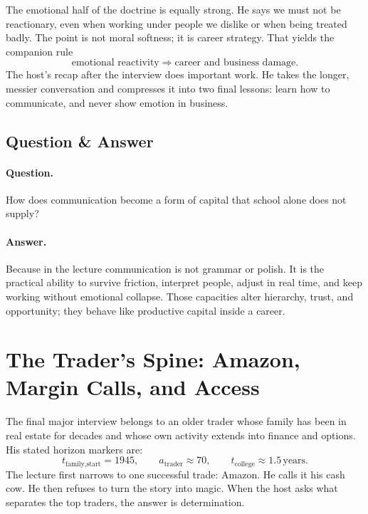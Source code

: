 The emotional half of the doctrine is equally strong. He says we must not be reactionary, even when working under people we dislike or when being treated badly. The point is not moral softness; it is career strategy. That yields the companion rule
\begin{equation}
\text{emotional reactivity} \Rightarrow \text{career and business damage}.
\end{equation}
The host's recap after the interview does important work. He takes the longer, messier conversation and compresses it into two final lessons: learn how to communicate, and never show emotion in business.

\subsection{Question \& Answer}

\paragraph{Question.} How does communication become a form of capital that school alone does not supply?

\paragraph{Answer.} Because in the lecture communication is not grammar or polish. It is the practical ability to survive friction, interpret people, adjust in real time, and keep working without emotional collapse. Those capacities alter hierarchy, trust, and opportunity; they behave like productive capital inside a career.

\section{The Trader's Spine: Amazon, Margin Calls, and Access}

The final major interview belongs to an older trader whose family has been in real estate for decades and whose own activity extends into finance and options. His stated horizon markers are:
\begin{equation}
t_{\text{family,start}} = 1945,
\qquad
a_{\text{trader}} \approx 70,
\qquad
t_{\text{college}} \approx 1.5\,\text{years}.
\end{equation}
The lecture first narrows to one successful trade: Amazon. He calls it his cash cow. He then refuses to turn the story into magic. When the host asks what separates the top traders, the answer is determination.

